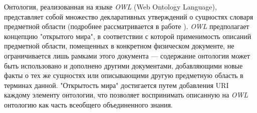 Онтология, реализованная на языке \textit{OWL} (Web Ontology Language), представляет собой множество декларативных утверждений о сущностях словаря предметной области (подробнее рассматривается в работе ). \textit{OWL} предполагает концепцию "открытого мира"{}, в соответствии с которой применимость описаний предметной области, помещенных в конкретном физическом документе, не ограничивается лишь рамками этого документа --- содержание онтологии может быть использовано и дополнено другими документами, добавляющими новые факты о тех же сущностях или описывающими другую предметную область в терминах данной. "Открытость мира"{} достигается путем добавления URI каждому элементу онтологии, что позволяет воспринимать описанную на \textit{OWL} онтологию как часть всеобщего объединенного знания.

